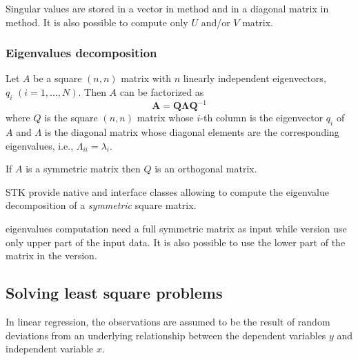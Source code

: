\documentclass[a4paper,10pt]{article}
\begin{document}
\begin{note}
Singular values are stored in a vector in \lapack{} method and in a diagonal matrix
in \stkpp{} method. It is also possible to compute only $U$ and/or $V$ matrix.
\end{note}

\subsubsection{Eigenvalues decomposition}

Let $A$ be a square $(n,n)$ matrix with $n$ linearly independent eigenvectors,
$ q_i \,\, (i = 1, \dots, N).$  Then $A$ can be factorized as
\[ \mathbf{A}=\mathbf{Q}\mathbf{\Lambda}\mathbf{Q}^{-1} \]
where $Q$ is the square $(n,n)$ matrix whose $i$-th column is the eigenvector
$ q_i$ of $A$ and $\Lambda$ is the diagonal matrix whose diagonal elements are
the corresponding eigenvalues, i.e., $ \Lambda_{ii}=\lambda_i $.

If $A$ is a symmetric matrix then $Q$ is an orthogonal matrix.

STK provide native and \lapack{} interface classes allowing to compute the eigenvalue
decomposition of a \emph{symmetric} square matrix.

\begin{minipage}[t]{0.66\textwidth}

\end{minipage}
\hspace{0.2cm}
\begin{minipage}[t]{0.33\textwidth}
\addtocounter{lstlisting}{-1}

\end{minipage}

\begin{note}
\stkpp{} eigenvalues computation need a full symmetric matrix as input while
\lapack{} version use only upper part of the input data.
It is also possible to use the lower part of the matrix in the \lapack{} version.
\end{note}

\subsection{Solving least square problems}

In linear regression, the observations are assumed to be the result of
random deviations from an underlying relationship between the dependent
variables $y$ and independent variable $x$.
\end{document}
